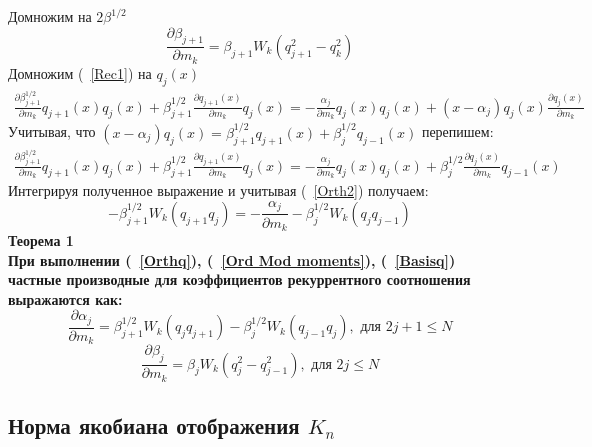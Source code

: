 Домножим на $2\beta^{1/2}$
\begin{equation}
\frac {\partial \beta_{j+1}} {\partial m_k}=\beta_{j+1}W_k(q_{j+1}^2-q_k^2)
\end{equation}
Домножим (~\ref{Rec1}) на $q_{j}(x)$
\begin{eqnarray}
\frac {\partial \beta_{j+1}^{1/2}} {\partial m_k}q_{j+1}(x)q_j(x)
+\beta_{j+1}^{1/2} \frac {\partial q_{j+1}(x) } {\partial m_k}q_{j}(x)
 = -\frac {\alpha_j} {\partial m_k} q_j(x)q_j(x)+
(x-\alpha_j)q_j(x) \frac {\partial q_j(x)} {\partial m_k} \nonumber
\end{eqnarray}
Учитывая, что
$(x-\alpha_j)q_j(x)=\beta_{j+1}^{1/2}q_{j+1}(x)+\beta_{j}^{1/2}q_{j-1}(x)$
перепишем:
\begin{eqnarray}
\frac {\partial \beta_{j+1}^{1/2}} {\partial m_k}q_{j+1}(x)q_j(x)
+\beta_{j+1}^{1/2} \frac {\partial q_{j+1}(x) } {\partial m_k}q_{j}(x)
 = -\frac {\alpha_j} {\partial m_k} q_j(x)q_j(x)+
\beta_{j}^{1/2}\frac {\partial q_j(x)} {\partial m_k}q_{j-1}(x) \nonumber
\end{eqnarray}
Интегрируя полученное выражение и учитывая (~\ref{Orth2}) получаем:
\begin{equation}
-\beta_{j+1}^{1/2}W_k(q_{j+1}q_j)=-\frac {\alpha_j} {\partial m_k}
-\beta_j^{1/2}W_k(q_jq_{j-1})
\end{equation}
\bf Теорема 1 \rm \\
При выполнении  (~\ref{Orthq}), (~\ref{Ord Mod moments}), (~\ref{Basisq})
частные производные для коэффициентов рекуррентного
соотношения выражаются как:
\begin{equation}
\frac{\partial \alpha_j} {\partial m_k}=\beta_{j+1}^{1/2}W_k(q_jq_{j+1})-\beta_{j}^{1/2}W_k(q_{j-1}q_{j}), \mbox {  для  } 2j+1 \leq N
\end{equation}
\begin{equation}
\frac{\partial \beta_j} {\partial m_k}=\beta_jW_k(q_j^2-q_{j-1}^2), \mbox{ для } 2j \leq N
\end{equation}

\subsection{Норма якобиана отображения $K_n$}

